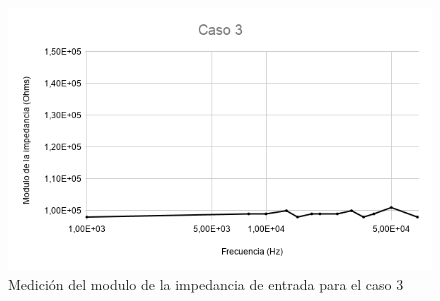 \begin{figure}[H]
\begin{centering}
\includegraphics[scale=0.5]{../Ex1/iA/Resources1a/zinpm3_med}
\par\end{centering}
\caption{Medición del modulo de la impedancia de entrada para el caso 3}

\end{figure}

